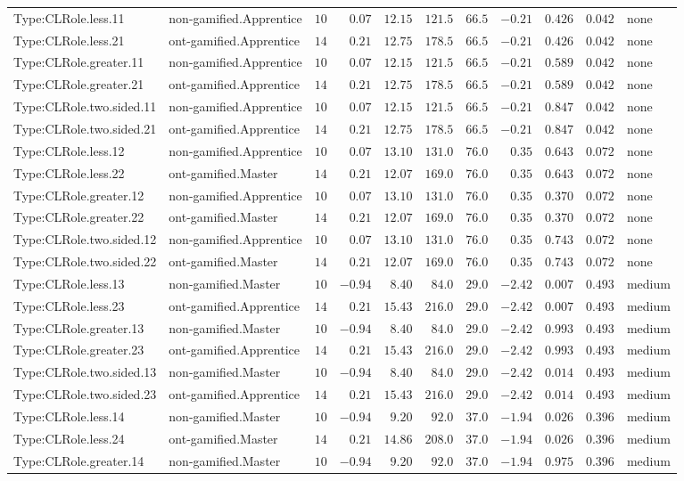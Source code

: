 \documentclass[6pt,a4paper]{article}
\begin{document}
{\begin{longtable}{llrrrrrrrrl}
Type:CLRole.less.11&non-gamified.Apprentice&$10$&$ 0.07$&$12.15$&$121.5$&$ 66.5$&$-0.21$&$0.426$&$0.042$&none\tabularnewline
Type:CLRole.less.21&ont-gamified.Apprentice&$14$&$ 0.21$&$12.75$&$178.5$&$ 66.5$&$-0.21$&$0.426$&$0.042$&none\tabularnewline
Type:CLRole.greater.11&non-gamified.Apprentice&$10$&$ 0.07$&$12.15$&$121.5$&$ 66.5$&$-0.21$&$0.589$&$0.042$&none\tabularnewline
Type:CLRole.greater.21&ont-gamified.Apprentice&$14$&$ 0.21$&$12.75$&$178.5$&$ 66.5$&$-0.21$&$0.589$&$0.042$&none\tabularnewline
Type:CLRole.two.sided.11&non-gamified.Apprentice&$10$&$ 0.07$&$12.15$&$121.5$&$ 66.5$&$-0.21$&$0.847$&$0.042$&none\tabularnewline
Type:CLRole.two.sided.21&ont-gamified.Apprentice&$14$&$ 0.21$&$12.75$&$178.5$&$ 66.5$&$-0.21$&$0.847$&$0.042$&none\tabularnewline
Type:CLRole.less.12&non-gamified.Apprentice&$10$&$ 0.07$&$13.10$&$131.0$&$ 76.0$&$ 0.35$&$0.643$&$0.072$&none\tabularnewline
Type:CLRole.less.22&ont-gamified.Master&$14$&$ 0.21$&$12.07$&$169.0$&$ 76.0$&$ 0.35$&$0.643$&$0.072$&none\tabularnewline
Type:CLRole.greater.12&non-gamified.Apprentice&$10$&$ 0.07$&$13.10$&$131.0$&$ 76.0$&$ 0.35$&$0.370$&$0.072$&none\tabularnewline
Type:CLRole.greater.22&ont-gamified.Master&$14$&$ 0.21$&$12.07$&$169.0$&$ 76.0$&$ 0.35$&$0.370$&$0.072$&none\tabularnewline
Type:CLRole.two.sided.12&non-gamified.Apprentice&$10$&$ 0.07$&$13.10$&$131.0$&$ 76.0$&$ 0.35$&$0.743$&$0.072$&none\tabularnewline
Type:CLRole.two.sided.22&ont-gamified.Master&$14$&$ 0.21$&$12.07$&$169.0$&$ 76.0$&$ 0.35$&$0.743$&$0.072$&none\tabularnewline
Type:CLRole.less.13&non-gamified.Master&$10$&$-0.94$&$ 8.40$&$ 84.0$&$ 29.0$&$-2.42$&$0.007$&$0.493$&medium\tabularnewline
Type:CLRole.less.23&ont-gamified.Apprentice&$14$&$ 0.21$&$15.43$&$216.0$&$ 29.0$&$-2.42$&$0.007$&$0.493$&medium\tabularnewline
Type:CLRole.greater.13&non-gamified.Master&$10$&$-0.94$&$ 8.40$&$ 84.0$&$ 29.0$&$-2.42$&$0.993$&$0.493$&medium\tabularnewline
Type:CLRole.greater.23&ont-gamified.Apprentice&$14$&$ 0.21$&$15.43$&$216.0$&$ 29.0$&$-2.42$&$0.993$&$0.493$&medium\tabularnewline
Type:CLRole.two.sided.13&non-gamified.Master&$10$&$-0.94$&$ 8.40$&$ 84.0$&$ 29.0$&$-2.42$&$0.014$&$0.493$&medium\tabularnewline
Type:CLRole.two.sided.23&ont-gamified.Apprentice&$14$&$ 0.21$&$15.43$&$216.0$&$ 29.0$&$-2.42$&$0.014$&$0.493$&medium\tabularnewline
Type:CLRole.less.14&non-gamified.Master&$10$&$-0.94$&$ 9.20$&$ 92.0$&$ 37.0$&$-1.94$&$0.026$&$0.396$&medium\tabularnewline
Type:CLRole.less.24&ont-gamified.Master&$14$&$ 0.21$&$14.86$&$208.0$&$ 37.0$&$-1.94$&$0.026$&$0.396$&medium\tabularnewline
Type:CLRole.greater.14&non-gamified.Master&$10$&$-0.94$&$ 9.20$&$ 92.0$&$ 37.0$&$-1.94$&$0.975$&$0.396$&medium\tabularnewline

\end{longtable}}
\end{document}
